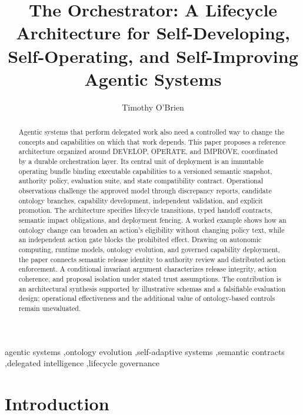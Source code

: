 \documentclass[preprint,12pt,authoryear]{elsarticle}
\begin{document}
\begin{frontmatter}
\title{The Orchestrator: A Lifecycle Architecture for Self-Developing,
Self-Operating, and Self-Improving Agentic Systems}
\author{Timothy O'Brien}
\begin{abstract}
\small
Agentic systems that perform delegated work also need a controlled way
to change the concepts and capabilities on which that work depends. This
paper proposes a reference architecture organized around DEVELOP,
OPERATE, and IMPROVE, coordinated by a durable orchestration layer. Its
central unit of deployment is an immutable operating bundle binding
executable capabilities to a versioned semantic snapshot, authority
policy, evaluation suite, and state compatibility contract. Operational
observations challenge the approved model through discrepancy reports,
candidate ontology branches, capability development, independent
validation, and explicit promotion. The architecture specifies lifecycle
transitions, typed handoff contracts, semantic impact obligations, and
deployment fencing. A worked example shows how an ontology change can
broaden an action's eligibility without changing policy text, while an
independent action gate blocks the prohibited effect. Drawing on
autonomic computing, runtime models, ontology evolution, and governed
capability deployment, the paper connects semantic release identity to
authority review and distributed action enforcement. A conditional
invariant argument characterizes release integrity, action coherence,
and proposal isolation under stated trust assumptions. The contribution
is an architectural synthesis supported by illustrative schemas and a
falsifiable evaluation design; operational effectiveness and the
additional value of ontology-based controls remain unevaluated.
\end{abstract}
\begin{keyword}
\small
agentic systems \sep ontology evolution \sep self-adaptive
systems \sep semantic contracts \sep delegated
intelligence \sep lifecycle governance
\end{keyword}
\end{frontmatter}
\pagestyle{plain}
\section{Introduction}\label{introduction}
\end{document}
